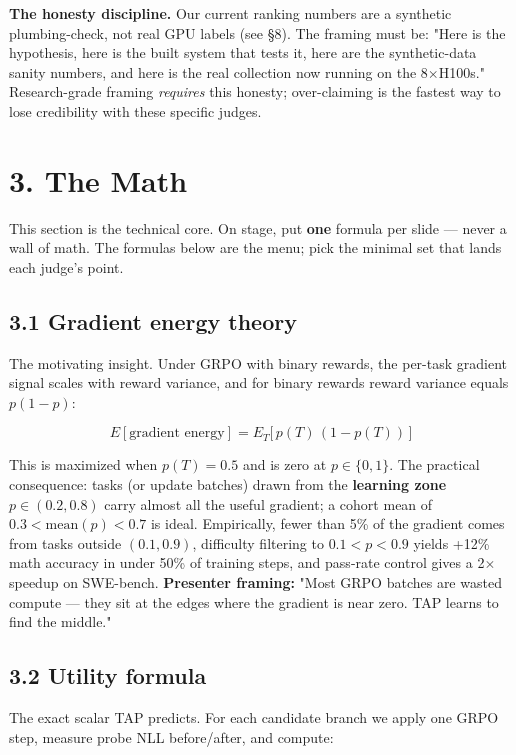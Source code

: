\documentclass[11pt,letterpaper]{article}
\begin{document}
\textbf{The honesty discipline.} Our current ranking numbers are a synthetic plumbing-check, not real GPU labels (see §8). The framing must be: "Here is the hypothesis, here is the built system that tests it, here are the synthetic-data sanity numbers, and here is the real collection now running on the 8$\times$H100s." Research-grade framing \emph{requires} this honesty; over-claiming is the fastest way to lose credibility with these specific judges.

\medskip

\section*{3. The Math}

This section is the technical core. On stage, put \textbf{one} formula per slide --- never a wall of math. The formulas below are the menu; pick the minimal set that lands each judge's point.

\subsection*{3.1 Gradient energy theory}

The motivating insight. Under GRPO with binary rewards, the per-task gradient signal scales with reward variance, and for binary rewards reward variance equals $p(1-p)$:

\[
E[\text{gradient energy}] = E_T\big[\, p(T)\,(1 - p(T)) \,\big]
\]

This is maximized when $p(T) = 0.5$ and is zero at $p \in \{0, 1\}$. The practical consequence: tasks (or update batches) drawn from the \textbf{learning zone} $p \in (0.2, 0.8)$ carry almost all the useful gradient; a cohort mean of $0.3 < \text{mean}(p) < 0.7$ is ideal. Empirically, fewer than 5\% of the gradient comes from tasks outside $(0.1, 0.9)$, difficulty filtering to $0.1 < p < 0.9$ yields +12\% math accuracy in under 50\% of training steps, and pass-rate control gives a 2$\times$ speedup on SWE-bench. \textbf{Presenter framing:} "Most GRPO batches are wasted compute --- they sit at the edges where the gradient is near zero. TAP learns to find the middle."

\subsection*{3.2 Utility formula}

The exact scalar TAP predicts. For each candidate branch we apply one GRPO step, measure probe NLL before/after, and compute:
\end{document}
